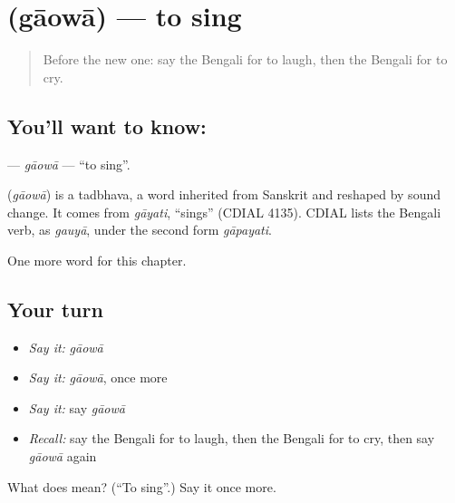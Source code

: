 \section[\texorpdfstring{\bn{গাওয়া} (gāowā)}{গাওয়া (gāowā)}]{ (gāowā) — to sing}

\label{lesson:BN-C50-gaowa}



\begin{quote}
Before the new one: say the Bengali for to laugh, then the Bengali for to cry.
\end{quote}

\subsection*{You'll want to know: }
\textbf{} — \emph{gāowā} — \textquotedblleft{}to sing\textquotedblright{}.

\begin{cousinweb}
\textbf{} (\emph{gāowā}) is a tadbhava, a word inherited from Sanskrit and reshaped by sound change. It comes from \emph{gāyati}, \textquotedblleft{}sings\textquotedblright{} (CDIAL 4135). CDIAL lists the Bengali verb, as \emph{gauyā}, under the second form \emph{gāpayati}.
\end{cousinweb}

\begin{grammarlens}[title={What you've built}]
One more word for this chapter.
\end{grammarlens}

\subsection*{Your turn}
\begin{itemize}
\raggedright
  \item \emph{Say it:} \emph{gāowā}
  \item \emph{Say it:} \emph{gāowā}, once more
  \item \emph{Say it:} say \emph{gāowā}
  \item \emph{Recall:} say the Bengali for to laugh, then the Bengali for to cry, then say \emph{gāowā} again
\end{itemize}

\begin{tcolorbox}[breakable,colback=teal!4,colframe=teal!35!black,title={Before you move on}]
What does  mean? (\textquotedblleft{}To sing\textquotedblright{}.) Say it once more.
\end{tcolorbox}
